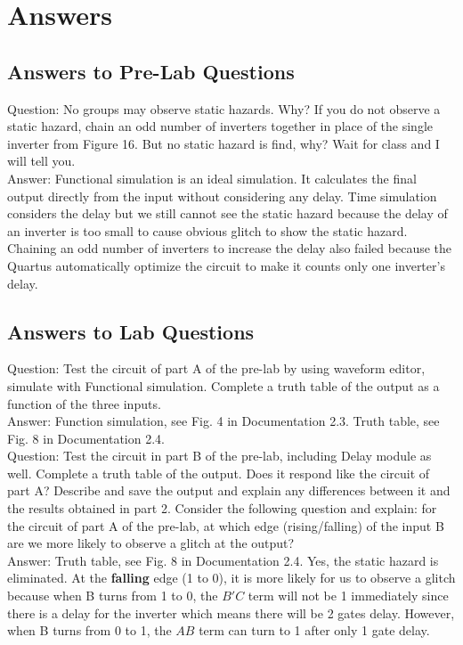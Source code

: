 \documentclass[12pt]{article}
\begin{document}
\section{Answers}
\subsection{\textbf{Answers to Pre-Lab Questions}}
Question: No groups may observe static hazards. Why? If you do not observe a static hazard, chain an odd number of inverters together in place of the single inverter from Figure 16. But no static hazard is find, why? Wait for class and I will tell you. \\

\noindent
Answer: Functional simulation is an ideal simulation. It calculates the final output directly from the input without considering any delay. Time simulation considers the delay but we still cannot see the static hazard because the delay of an inverter is too small to cause obvious glitch to show the static hazard. Chaining an odd number of inverters to increase the delay also failed because the Quartus automatically optimize the circuit to make it counts only one inverter's delay. \\

\subsection{\textbf{Answers to Lab Questions}}
Question: Test the circuit of part A of the pre-lab by using waveform editor, simulate with Functional simulation. Complete a truth table of the output as a function of the three inputs. \\

\noindent
Answer: Function simulation, see Fig. 4 in Documentation 2.3. Truth table, see Fig. 8 in Documentation 2.4. \\

\noindent
Question: Test the circuit in part B of the pre-lab, including Delay module as well. Complete a truth table of the output. Does it respond like the circuit of part A? Describe and save the output and explain any differences between it and the results obtained in part 2. Consider the following question and explain: for the circuit of part A of the pre-lab, at which edge (rising/falling) of the input B are we more likely to observe a glitch at the output? \\

\noindent
Answer: Truth table, see Fig. 8 in Documentation 2.4. Yes, the static hazard is eliminated. At the \textbf{falling} edge (1 to 0), it is more likely for us to observe a glitch because when B turns from 1 to 0, the $B'C$ term will not be 1 immediately since there is a delay for the inverter which means there will be 2 gates delay. However, when B turns from 0 to 1, the $AB$ term can turn to 1 after only 1 gate delay. \\
\end{document}
